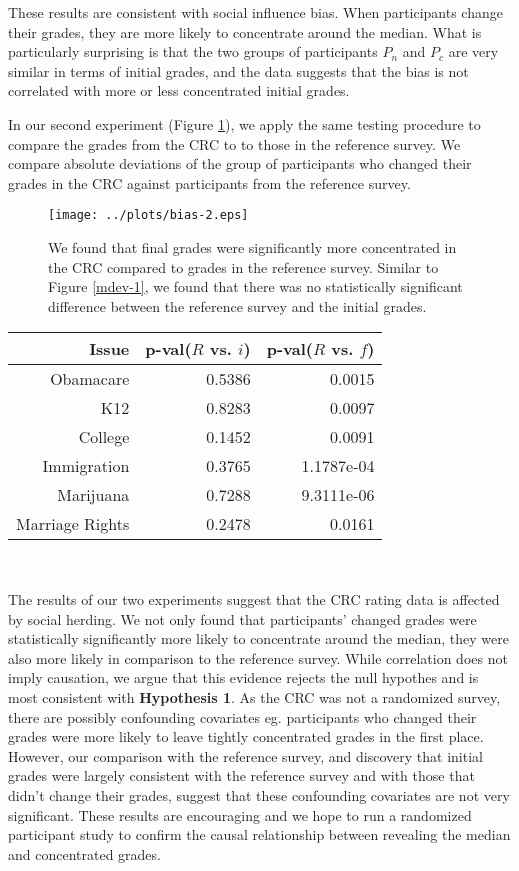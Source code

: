 These results are consistent with social influence bias.
When participants change their grades, they are more likely to concentrate around the median.
What is particularly surprising is that the two groups of participants $P_n$ and $P_c$ are very similar in terms of initial grades, and the data suggests that the bias is not correlated with more or less concentrated initial grades.

In our second experiment (Figure \ref{mdev-2}), we apply the same testing procedure to compare the grades from the CRC to to those in the reference survey.
We compare absolute deviations of the group of participants who changed their grades in the CRC against participants from the reference survey.
\begin{figure}[h]
\hspace{-2.6em}
    \texttt{[image: ../plots/bias-2.eps]}
      \caption{We found that final grades were significantly more concentrated in the CRC compared to grades in the reference survey. Similar to Figure \ref{mdev-1}, we found that there was no statistically significant difference between the reference survey and the initial grades.}
      \label{mdev-2}
\end{figure}

{\centering
\scriptsize
\begin{tabular}[!ht] { r | r | r }
\label{ref-1}
  Issue & p-val($R$ vs. $i$) & p-val($R$ vs. $f$) \\
  \hline
  \hline
  Obamacare &  0.5386 & 0.0015 \\
  \hline
  K12 & 0.8283 & 0.0097 \\
  \hline
  College & 0.1452 & 0.0091 \\
  \hline
  Immigration & 0.3765 & 1.1787e-04\\
  \hline
  Marijuana & 0.7288 & 9.3111e-06\\
  \hline
  Marriage Rights & 0.2478 & 0.0161 \\
\end{tabular}\\[1\baselineskip]
}

The results of our two experiments suggest that the CRC rating data is affected by social herding.
We not only found that participants' changed grades were statistically significantly more likely to concentrate around the median, they were also more likely in comparison to the reference survey.
While correlation does not imply causation, we argue that this evidence rejects the null hypothes and is most consistent with \textbf{Hypothesis 1}.
As the CRC was not a randomized survey, there are possibly confounding covariates eg. participants who changed their grades were more likely to leave tightly concentrated grades in the first place.
However, our comparison with the reference survey, and discovery that initial grades were largely consistent with the reference survey and with those that didn't change their grades, suggest that these confounding covariates are not very significant.
These results are encouraging and we hope to run a randomized participant study to confirm the causal relationship between revealing the median and concentrated grades.

